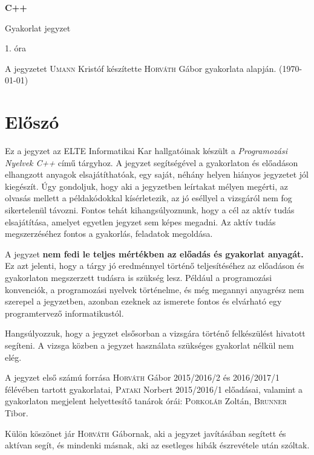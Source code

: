 \documentclass[a4paper,11.5pt,table]{article}
\begin{document}
	\setlength\parindent{0pt}
	\def\<{<\hspace{0mm}<}
	
	\theoremstyle{definition}
	\newtheorem{note}{Megjegyzés}[subsection]
	
	\begin{center}
		{\LARGE\textbf{C++}}
		
		{\Large Gyakorlat jegyzet}
		
		1. óra
	\end{center}
	A jegyzetet \textsc{Umann} Kristóf készítette \textsc{Horváth} Gábor gyakorlata alapján. (\today)
	\section{Előszó}
	Ez a jegyzet az ELTE Informatikai Kar hallgatóinak készült a \emph{Programozási Nyelvek C++} című tárgyhoz. A jegyzet segítségével a gyakorlaton és előadáson elhangzott anyagok elsajátíthatóak, egy saját, néhány helyen hiányos jegyzetet jól kiegészít. Úgy gondoljuk, hogy aki a jegyzetben leírtakat mélyen megérti, az olvasás mellett a példakódokkal kísérletezik, az jó eséllyel a vizsgáról nem fog sikertelenül távozni. Fontos tehát kihangsúlyoznunk, hogy a cél az aktív tudás elsajátítása, amelyet egyetlen jegyzet sem képes megadni. Az aktív tudás megszerzéséhez fontos a gyakorlás, feladatok megoldása.
	
	A jegyzet \textbf{nem fedi le teljes mértékben az előadás és gyakorlat anyagát.} Ez azt jelenti, hogy a tárgy jó eredménnyel történő teljesítéséhez az előadáson és gyakorlaton megszerzett tudásra is szükség lesz. Például a programozási konvenciók, a programozási nyelvek történelme, és még megannyi anyagrész nem szerepel a jegyzetben, azonban ezeknek az ismerete fontos és elvárható egy programtervező informatikustól.
	
	\smallskip
	Hangsúlyozzuk, hogy a jegyzet elsősorban a vizsgára történő felkészülést hivatott segíteni. A vizsga közben a jegyzet használata szükséges gyakorlat nélkül nem elég.
	
	\smallskip
	A jegyzet első számú forrása \textsc{Horváth} Gábor 2015/2016/2 és 2016/2017/1 félévében tartott gyakorlatai, \textsc{Pataki} Norbert 2015/2016/1 előadásai, valamint a gyakorlaton megjelent helyettesítő tanárok órái: \textsc{Porkoláb} Zoltán, \textsc{Brunner} Tibor.
	
	Külön köszönet jár \textsc{Horváth} Gábornak, aki a jegyzet javításában segített és aktívan segít, és mindenki másnak, aki az esetleges hibák észrevétele után szóltak.
	
\end{document}
